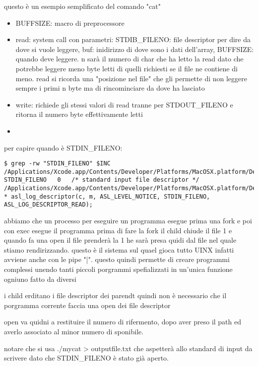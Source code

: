 questo è un esempio semplificato del comando "cat"

\begin{itemize}
	\item BUFFSIZE: macro di preprocessore
	\item read: system call con parametri: STDIB\_FILENO: file descriptor per dire da dove si vuole leggere, buf: inidirizzo di dove sono i dati dell'array, BUFFSIZE: quando deve leggere. n sarà il numero di char che ha letto la read dato che potrebbe leggere meno byte letti di quelli richiesti se il file ne contiene di meno. read si ricorda una "posizione nel file" che gli permette di non leggere sempre i primi n byte ma di rincominciare da dove ha lasciato
	\item write: richiede gli stessi valori di read tranne per STDOUT\_FILENO e ritorna il numero byte effettivamente letti
	\item 
\end{itemize}


per capire quando è STDIN\_FILENO:

\begin{lstlisting}
$ grep -rw "STDIN_FILENO" $INC
/Applications/Xcode.app/Contents/Developer/Platforms/MacOSX.platform/Developer/SDKs/MacOSX.sdk/usr/include//unistd.h:#define	 STDIN_FILENO	0	/* standard input file descriptor */
/Applications/Xcode.app/Contents/Developer/Platforms/MacOSX.platform/Developer/SDKs/MacOSX.sdk/usr/include//asl.h: * asl_log_descriptor(c, m, ASL_LEVEL_NOTICE, STDIN_FILENO, ASL_LOG_DESCRIPTOR_READ);
\end{lstlisting}

abbiamo che un processo per eseguire un programma esegue prima una fork e poi con exec esegue il programma prima di fare la fork il child chiude il file 1 e quando fa una open il file prenderà la 1 he sarà presa quidi dal file nel quale stiamo rendirizzando. questo è il sistema sul quael gioca tutto UINX infatti avviene anche con le pipe "|". questo quindi permette di creare programmi complessi unendo tanti piccoli porgrammi spefializzati in un'unica funzione ogniuno fatto da diversi 

i child erditano i file descriptor dei parendt quindi non è necessario che il porgramma corrente faccia una open dei file descriptor

open va quidni a restituire il numero di rifermento, dopo aver preso il path ed averlo associato al minor numero di sponibile.

notare che si usa ./mycat > outputfile.txt che aspetterà allo standard di input da scrivere dato che STDIN\_FILENO è stato già aperto.

